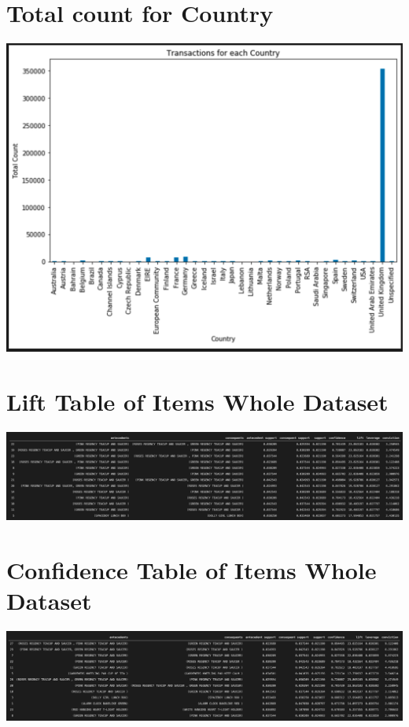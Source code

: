 \documentclass[a4paper,10pt]{article}
\begin{document}
\medskip
\newpage
\begin{appendices}
	\section{Total count for Country}
	\label{appendix:totalcountall}
	\includegraphics[scale=0.5]{totalcount}
	
	\section{Lift Table of Items Whole Dataset}
	\label{appendix:wholelift}
	\includegraphics[scale=0.2]{wholelift}
	
	\section{Confidence Table of Items Whole Dataset}
	\label{appendix:wholeconf}
	\includegraphics[scale=0.2]{wholeconf}
	

\end{appendices}
\end{document}
